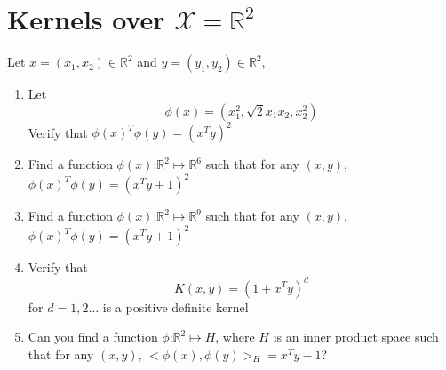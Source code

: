 \documentclass[12pt]{article}
\begin{document}
\section{Kernels over $\mathcal{X}=\mathbb{R}^2$}
Let $x=(x_1,x_2) \in \mathbb{R}^2$ and $y=(y_1,y_2) \in \mathbb{R}^2$,
\begin{enumerate}
\item Let 
$$\phi(x)=(x_1^2,\sqrt{2}x_1x_2,x_2^2)$$
Verify that $\phi(x)^T\phi(y) = (x^Ty)^2$
\item Find a function $\phi(x)$:$\mathbb{R}^2 \mapsto \mathbb{R}^6$ such that for any $(x,y)$, $\phi(x)^T\phi(y) = (x^Ty+1)^2$
\item Find a function $\phi(x)$:$\mathbb{R}^2 \mapsto \mathbb{R}^9$ such that for any $(x,y)$, $\phi(x)^T\phi(y) = (x^Ty+1)^2$
\item Verify that $$K(x,y)=(1+x^Ty)^d$$ for $d=1,2\ldots$ is a positive definite kernel
\item Can you find a function $\phi$:$\mathbb{R}^2 \mapsto H$, where $H$ is an inner product space such that for any $(x,y)$, $<\phi(x),\phi(y)>_H = x^Ty -1$? 
\end{enumerate}
\end{document}
